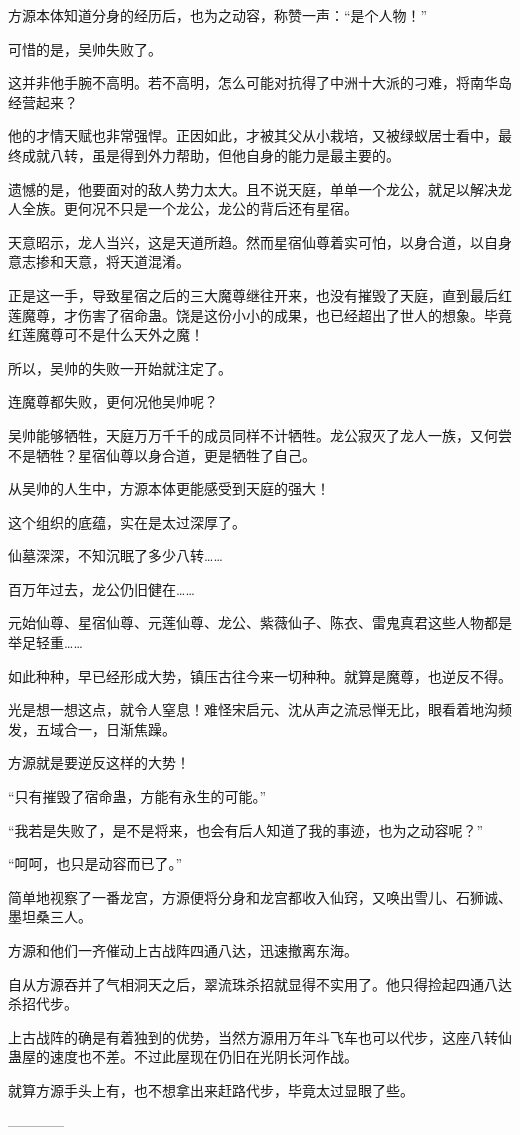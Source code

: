 \begin{this_body}
方源本体知道分身的经历后，也为之动容，称赞一声：“是个人物！”

可惜的是，吴帅失败了。

这并非他手腕不高明。若不高明，怎么可能对抗得了中洲十大派的刁难，将南华岛经营起来？

他的才情天赋也非常强悍。正因如此，才被其父从小栽培，又被绿蚁居士看中，最终成就八转，虽是得到外力帮助，但他自身的能力是最主要的。

遗憾的是，他要面对的敌人势力太大。且不说天庭，单单一个龙公，就足以解决龙人全族。更何况不只是一个龙公，龙公的背后还有星宿。

天意昭示，龙人当兴，这是天道所趋。然而星宿仙尊着实可怕，以身合道，以自身意志掺和天意，将天道混淆。

正是这一手，导致星宿之后的三大魔尊继往开来，也没有摧毁了天庭，直到最后红莲魔尊，才伤害了宿命蛊。饶是这份小小的成果，也已经超出了世人的想象。毕竟红莲魔尊可不是什么天外之魔！

所以，吴帅的失败一开始就注定了。

连魔尊都失败，更何况他吴帅呢？

吴帅能够牺牲，天庭万万千千的成员同样不计牺牲。龙公寂灭了龙人一族，又何尝不是牺牲？星宿仙尊以身合道，更是牺牲了自己。

从吴帅的人生中，方源本体更能感受到天庭的强大！

这个组织的底蕴，实在是太过深厚了。

仙墓深深，不知沉眠了多少八转……

百万年过去，龙公仍旧健在……

元始仙尊、星宿仙尊、元莲仙尊、龙公、紫薇仙子、陈衣、雷鬼真君这些人物都是举足轻重……

如此种种，早已经形成大势，镇压古往今来一切种种。就算是魔尊，也逆反不得。

光是想一想这点，就令人窒息！难怪宋启元、沈从声之流忌惮无比，眼看着地沟频发，五域合一，日渐焦躁。

方源就是要逆反这样的大势！

“只有摧毁了宿命蛊，方能有永生的可能。”

“我若是失败了，是不是将来，也会有后人知道了我的事迹，也为之动容呢？”

“呵呵，也只是动容而已了。”

简单地视察了一番龙宫，方源便将分身和龙宫都收入仙窍，又唤出雪儿、石狮诚、墨坦桑三人。

方源和他们一齐催动上古战阵四通八达，迅速撤离东海。

自从方源吞并了气相洞天之后，翠流珠杀招就显得不实用了。他只得捡起四通八达杀招代步。

上古战阵的确是有着独到的优势，当然方源用万年斗飞车也可以代步，这座八转仙蛊屋的速度也不差。不过此屋现在仍旧在光阴长河作战。

就算方源手头上有，也不想拿出来赶路代步，毕竟太过显眼了些。

------------

\end{this_body}

